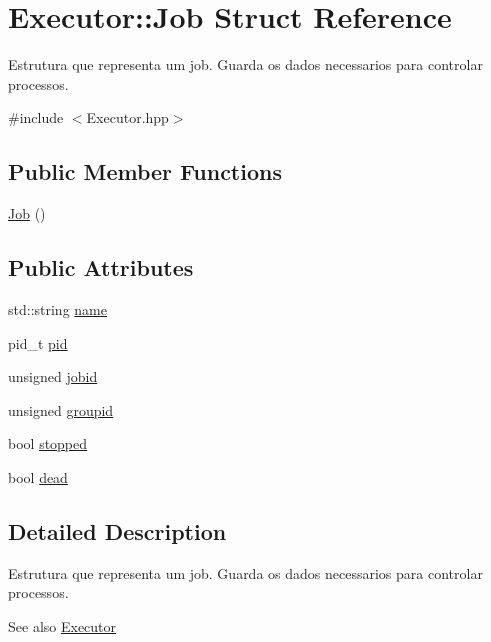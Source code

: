 \hypertarget{structExecutor_1_1Job}{
\section{Executor::Job Struct Reference}
\label{structExecutor_1_1Job}
}


Estrutura que representa um job. Guarda os dados necessarios para controlar processos.  




{\ttfamily \#include $<$Executor.hpp$>$}

\subsection*{Public Member Functions}
\begin{DoxyCompactItemize}
\item 
\hyperlink{structExecutor_1_1Job_aa6e1a092856e7ebc043adfb1eaa2c627}{Job} ()
\end{DoxyCompactItemize}
\subsection*{Public Attributes}
\begin{DoxyCompactItemize}
\item 
std::string \hyperlink{structExecutor_1_1Job_a38039efac2d62af668c99b63719f6125}{name}
\item 
pid\_\-t \hyperlink{structExecutor_1_1Job_a8d9163526e877fe1f603b66504ef8950}{pid}
\item 
unsigned \hyperlink{structExecutor_1_1Job_a9429fceffd304e1666ba1e8d0495c3f9}{jobid}
\item 
unsigned \hyperlink{structExecutor_1_1Job_ab3f85f9152e9b5457896f1b72fa8508c}{groupid}
\item 
bool \hyperlink{structExecutor_1_1Job_ac0ea0bc0c71fe4c1a2ad981df09fb5b0}{stopped}
\item 
bool \hyperlink{structExecutor_1_1Job_a7574b1ef35cd0dace06aee928fead108}{dead}
\end{DoxyCompactItemize}


\subsection{Detailed Description}
Estrutura que representa um job. Guarda os dados necessarios para controlar processos. \begin{DoxySeeAlso}{See also}
\hyperlink{classExecutor}{Executor} 
\end{DoxySeeAlso}


